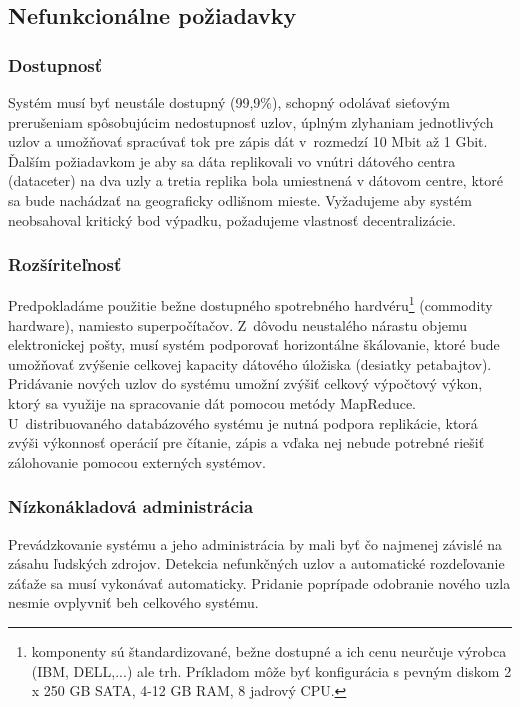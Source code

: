 \documentclass[11pt,twoside,a4paper]{book}
\begin{document}



\subsection{Nefunkcionálne požiadavky}

\subsubsection*{Dostupnosť}
Systém musí byť neustále dostupný (99,9\%), schopný odolávať sieťovým prerušeniam spôsobujúcim nedostupnosť uzlov, úplným zlyhaniam jednotlivých uzlov a umožňovať spracúvať tok pre zápis dát v~rozmedzí 10 Mbit až 1 Gbit. Ďalším požiadavkom je aby sa dáta replikovali vo vnútri dátového centra (dataceter) na dva uzly a tretia replika bola umiestnená v dátovom centre, ktoré sa bude nachádzať na geograficky odlišnom mieste. Vyžadujeme aby systém neobsahoval kritický bod výpadku, požadujeme vlastnosť decentralizácie.

\subsubsection*{Rozšíriteľnosť}
Predpokladáme použitie bežne dostupného spotrebného hardvéru\footnote{komponenty sú štandardizované, bežne dostupné a ich cenu neurčuje výrobca (IBM, DELL,...) ale trh. Príkladom môže byť konfigurácia s pevným diskom 2 x 250 GB SATA, 4-12 GB RAM, 8 jadrový CPU.} (commodity hardware), namiesto superpočítačov. Z~dôvodu neustalého nárastu objemu elektronickej pošty, musí systém podporovať horizontálne škálovanie, ktoré bude umožňovať zvýšenie celkovej kapacity dátového úložiska (desiatky petabajtov). Pridávanie nových uzlov do systému umožní zvýšiť celkový výpočtový výkon, ktorý sa využije na spracovanie dát pomocou metódy MapReduce. U~distribuovaného databázového systému je nutná podpora replikácie, ktorá zvýši výkonnosť operácií pre čítanie, zápis a vďaka nej nebude potrebné riešiť zálohovanie pomocou externých systémov.

\subsubsection*{Nízkonákladová administrácia}
Prevádzkovanie systému a jeho administrácia by mali byť čo najmenej závislé na zásahu ľudských zdrojov. Detekcia nefunkčných uzlov a automatické rozdeľovanie záťaže sa musí vykonávať automaticky. Pridanie poprípade odobranie nového uzla nesmie ovplyvniť beh celkového systému.
\end{document}
